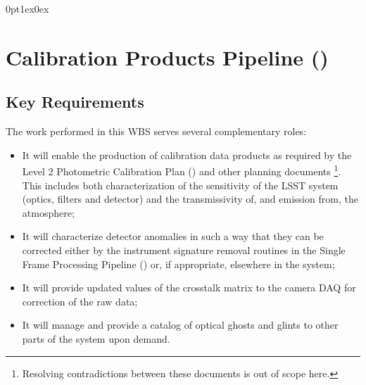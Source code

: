 \titlespacing*{\subsubsection}
{0pt}{1ex}{0ex}


\section{Calibration Products Pipeline (\wbsCPP)}

\subsection{Key Requirements}

The work performed in this WBS serves several complementary roles:

\begin{itemize}
 \item It will enable the production of calibration data products as required by the Level 2 Photometric Calibration Plan (\NewPCP{}) and other planning documents \cite{Lupton15}\footnote{Resolving contradictions between these documents is out of scope here.}. This includes both characterization of the sensitivity of the LSST system (optics, filters and detector) and the transmissivity of, and emission from, the atmosphere;
 
 \item It will characterize detector anomalies in such a way that they can be corrected either by the instrument signature removal routines in the Single Frame Processing Pipeline (\wbsSFM) or, if appropriate, elsewhere in the system;
 
 \item It will provide updated values of the crosstalk matrix to the camera DAQ for correction of the raw data;
 
 \item It will manage and provide a catalog of optical ghosts and glints to other parts of the system upon demand.
\end{itemize}



